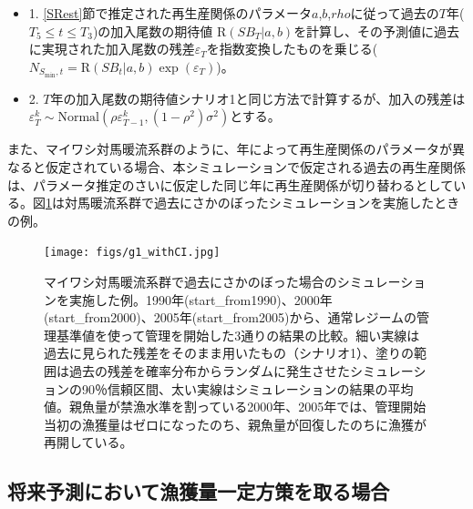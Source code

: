 \documentclass[11pt]{jsarticle}
\begin{document}
\begin{itemize}
\item 1. \ref{SRest}節で推定された再生産関係のパラメータ$a$,$b$,$rho$に従って過去の$T$年($T_5 \leq t \leq T_3$)の加入尾数の期待値 $\mathrm{R}(S\!B_{T}|a,b)$を計算し、その予測値に過去に実現された加入尾数の残差$\varepsilon_{T}$を指数変換したものを乗じる($ N_{S_{\mathrm{min}},t} = \mathrm{R}(S\!B_{t}|a,b) \exp (\varepsilon_T)$)。
\item 2. $T$年の加入尾数の期待値シナリオ1と同じ方法で計算するが、加入の残差は$\varepsilon_{T}^k \sim \mathrm{Normal} (\rho \varepsilon_{T-1}^k,(1-\rho^2) \sigma^2)$とする。
\end{itemize}

また、マイワシ対馬暖流系群のように、年によって再生産関係のパラメータが異なると仮定されている場合、本シミュレーションで仮定される過去の再生産関係は、パラメータ推定のさいに仮定した同じ年に再生産関係が切り替わるとしている。図\ref{fig_whatif}は対馬暖流系群で過去にさかのぼったシミュレーションを実施したときの例。

 \begin{figure}[b]
   \texttt{[image: figs/g1\_withCI.jpg]}
   \caption{
     マイワシ対馬暖流系群で過去にさかのぼった場合のシミュレーションを実施した例。1990年(start\_from1990)、2000年(start\_from2000)、2005年(start\_from2005)から、通常レジームの管理基準値を使って管理を開始した3通りの結果の比較。細い実線は過去に見られた残差をそのまま用いたもの（シナリオ1）、塗りの範囲は過去の残差を確率分布からランダムに発生させたシミュレーションの90％信頼区間、太い実線はシミュレーションの結果の平均値。親魚量が禁漁水準を割っている2000年、2005年では、管理開始当初の漁獲量はゼロになったのち、親魚量が回復したのちに漁獲が再開している。
   }
   \label{fig_whatif}
 \end{figure}

 

\subsection{将来予測において漁獲量一定方策を取る場合\label{ConstCatch}}
\end{document}
